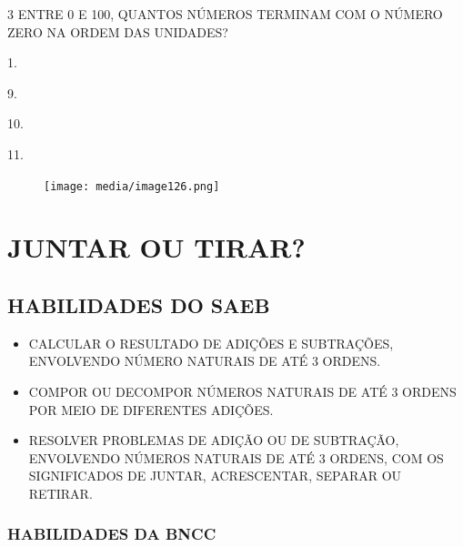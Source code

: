 \num{3} ENTRE 0 E 100, QUANTOS NÚMEROS TERMINAM COM O NÚMERO ZERO NA ORDEM DAS UNIDADES?

\begin{escolha}
\item
  1.
\item
  9.
\item
  10.
\item
  11.
\end{escolha}

\begin{figure}[H]
\texttt{[image: media/image126.png]}
\end{figure}

\chapter{JUNTAR OU TIRAR?}


\section*{HABILIDADES DO SAEB}

\begin{itemize}
\item \uppercase{Calcular o resultado de adições e subtrações, envolvendo número
naturais de até 3 ordens.}

\item \uppercase{Compor ou decompor números naturais de até 3 ordens por meio de
diferentes adições.}

\item \uppercase{Resolver problemas de adição ou de subtração, envolvendo números
naturais de até 3 ordens, com os significados de juntar, acrescentar,
separar ou retirar.}
\end{itemize}

\subsection{HABILIDADES DA BNCC}

